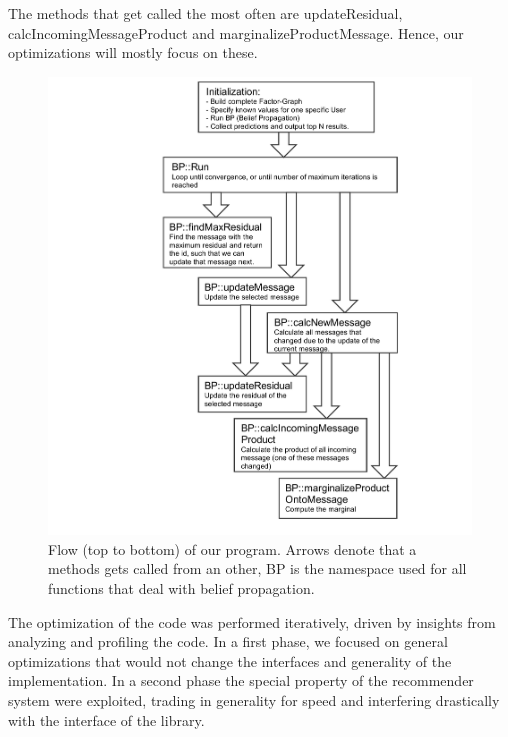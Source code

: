 
The methods that get called the most often are updateResidual, calcIncomingMessageProduct and marginalizeProductMessage. Hence, our optimizations will mostly focus on these.

\begin{figure}\centering
    \includegraphics[scale=0.63, trim={6.5cm 0cm 0 0cm},clip]{graphics/loopybp.pdf}
  \caption{Flow (top to bottom) of our program. Arrows denote that a methods gets called from an other, BP is the namespace used for all functions that deal with belief propagation.\label{overviewflow}}
\end{figure}


The optimization of the code was performed iteratively, driven by insights from analyzing and profiling the code. In a first phase, we focused on general optimizations that would not change the interfaces and generality of the implementation. In a second phase the special property of the recommender system were exploited, trading in generality for speed and interfering drastically with the interface of the library.

